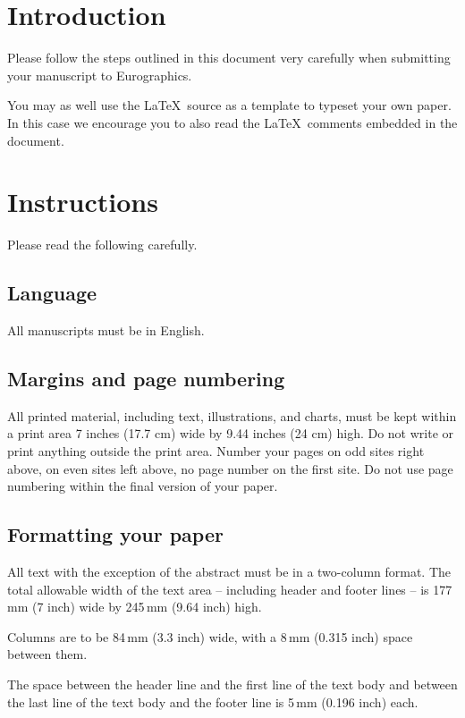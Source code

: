 \section{Introduction}

Please follow the steps outlined in this document very carefully when
submitting your manuscript to Eurographics.

You may as well use the \LaTeX\ source as a template to typeset your own
paper. In this case we encourage you to also read the \LaTeX\ comments
embedded in the document.

\section{Instructions}

Please read the following carefully.

\subsection{Language}

All manuscripts must be in English.

\subsection{Margins and page numbering}

All printed material, including text, illustrations, and charts,
must be kept within a print area 7 inches (17.7 cm) wide by
9.44 inches (24 cm) high. Do not write or print anything
outside the print area. Number your pages on odd sites right
above, on even sites left above, no page number on the first site.
Do not use page numbering within the final version of your paper.


\subsection{Formatting your paper}



All text with the exception of the abstract must be in a two-column format.
The total allowable width of the text area -- including header and footer
lines -- is 177\,mm (7 inch) wide by 245\,mm (9.64 inch) high.

Columns are to be 84\,mm (3.3 inch) wide, with a 8\,mm (0.315 inch) space 
between them.

The space between the header line and the first line of the text body and
between the last line of the text body and the footer line is 5\,mm
(0.196 inch) each.

